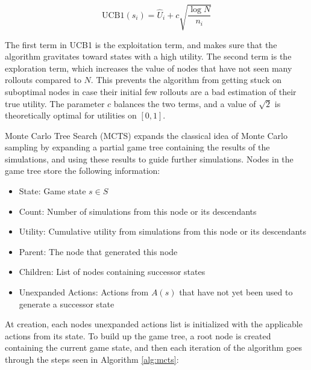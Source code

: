 \begin{equation}
    \text{UCB1}(s_i) = \hat{U}_i + 
    c\sqrt{\frac{\log{N}}{n_i}}
\end{equation}

The first term in UCB1 is the exploitation term, and makes sure that the algorithm gravitates toward states with a high utility. The second term is the exploration term, which increases the value of nodes that have not seen many rollouts compared to $N$. This prevents the algorithm from getting stuck on suboptimal nodes in case their initial few rollouts are a bad estimation of their true utility. The parameter $c$ balances the two terms, and a value of $\sqrt{2}$ is theoretically optimal for utilities on $[0, 1]$.

Monte Carlo Tree Search (MCTS) \cite{Coulom2006, Chang2005} expands the classical idea of Monte Carlo sampling by expanding a partial game tree containing the results of the simulations, and using these results to guide further simulations. Nodes in the game tree store the following information:

\begin{itemize}
    \item State: Game state $s \in S$
    \item Count: Number of simulations from this node or its descendants
    \item Utility: Cumulative utility from simulations from this node or its descendants
    \item Parent: The node that generated this node
    \item Children: List of nodes containing successor states
    \item Unexpanded Actions: Actions from $A(s)$ that have not yet been used to generate a successor state 
\end{itemize}

At creation, each nodes unexpanded actions list is initialized
with the applicable actions from its state. To build up the 
game tree, a root node is created containing the 
current game state, and then each iteration of the algorithm goes through 
the steps seen in Algorithm \ref{alg:mcts}:



